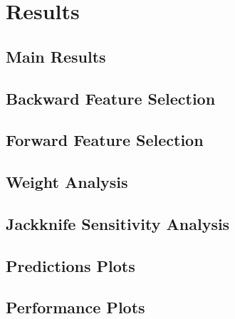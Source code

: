 \documentclass{article}
\begin{document}
\section{Results}
\subsection{Main Results}
		
\subsection{Backward Feature Selection}
	
\subsection{Forward Feature Selection}

\subsection{Weight Analysis}

\subsection{Jackknife Sensitivity Analysis}


\subsection{Predictions Plots}

\subsection{Performance Plots}
\end{document}

